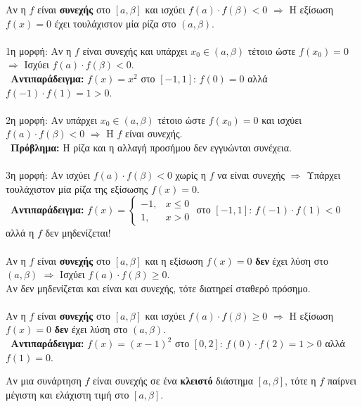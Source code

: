 \theor{\true}
Αν η $f$ είναι \textbf{συνεχής} στο $[a,\beta]$ και ισχύει $f(a)\cdot f(\beta)<0$ $\Rightarrow$ Η εξίσωση $f(x)=0$ έχει τουλάχιστον μία ρίζα στο $(a,\beta)$.\\\\
\antistr{\false}
{\kerkissans 1η μορφή:} Αν η $f$ είναι συνεχής και υπάρχει $x_0\in(a,\beta)$ τέτοιο ώστε $f(x_0)=0$ $\Rightarrow$ Ισχύει $f(a)\cdot f(\beta)<0$.\\
\textcolor{error}{\faTimes\ \textbf{Αντιπαράδειγμα:}} $f(x)=x^2$ στο $[-1,1]$: $f(0)=0$ αλλά $f(-1)\cdot f(1)=1>0$.\\\\
{\kerkissans 2η μορφή:} Αν υπάρχει $x_0\in(a,\beta)$ τέτοιο ώστε $f(x_0)=0$ και ισχύει $f(a)\cdot f(\beta)<0$ $\Rightarrow$ Η $f$ είναι συνεχής.\\
\textcolor{error}{\faTimes\ \textbf{Πρόβλημα:}} Η ρίζα και η αλλαγή προσήμου δεν εγγυώνται συνέχεια.\\\\
{\kerkissans 3η μορφή:} Αν ισχύει $f(a)\cdot f(\beta)<0$ χωρίς η $f$ να είναι συνεχής $\Rightarrow$ Υπάρχει τουλάχιστον μία ρίζα της εξίσωσης $f(x)=0$.\\
\textcolor{error}{\faTimes\ \textbf{Αντιπαράδειγμα:}} $f(x)=\begin{cases} -1, & x\le 0 \\ 1, & x>0 \end{cases}$ στο $[-1,1]$: $f(-1)\cdot f(1)<0$ αλλά η $f$ δεν μηδενίζεται!\\\\
\aath{\true}
Αν η $f$ είναι \textbf{συνεχής} στο $[a,\beta]$ και η εξίσωση $f(x)=0$ \textbf{δεν} έχει λύση στο $(a,\beta)$
$\Rightarrow$ Ισχύει $f(a)\cdot f(\beta)\ge 0$.\\
{\small Αν δεν μηδενίζεται και είναι και συνεχής, τότε διατηρεί σταθερό πρόσημο.}\\\\
\aaa{\false}
Αν η $f$ είναι \textbf{συνεχής} στο $[a,\beta]$ και ισχύει $f(a)\cdot f(\beta)\ge 0$ $\Rightarrow$ Η εξίσωση $f(x)=0$ \textbf{δεν} έχει λύση στο $(a,\beta)$.\\
\textcolor{error}{\faTimes\ \textbf{Αντιπαράδειγμα:}} $f(x)=(x-1)^2$ στο $[0,2]$: $f(0)\cdot f(2)=1>0$ αλλά $f(1)=0$.

\vspace{1cm}


Αν μια συνάρτηση $f$ είναι συνεχής σε ένα \textbf{κλειστό} διάστημα $[a,\beta]$, τότε η $f$ παίρνει μέγιστη και ελάχιστη τιμή στο $[a,\beta]$.

